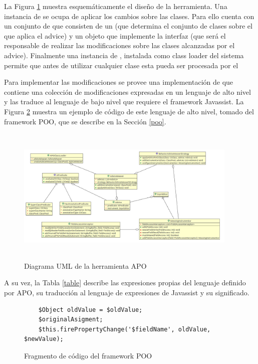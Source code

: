 		La Figura \ref{aopImage} muestra esquemáticamente el diseño de la herramienta.
		Una instancia de  se ocupa de aplicar los cambios sobre las
		clases.
		Para ello cuenta con un conjunto de  que consisten de un
		 (que determina el conjunto de clases sobre el que aplica el
		advice) y un objeto que implemente la interfaz  (que
		será el responsable de realizar las modificaciones sobre
		las clases alcanzadas por el advice).
		Finalmente una instancia de , instalada como class loader
		del sistema permite que antes de utilizar cualquier clase esta pueda ser procesada por el 
		
		Para implementar las modificaciones se provee una implementación de
		 que contiene una colección de modificaciones expresadas en un
		lenguaje de alto nivel y las traduce al lenguaje de bajo nivel que requiere el
		framework Javassist.
		La Figura \ref{pooCode} muestra un ejemplo de código de este lenguaje de alto nivel,
		tomado del framework POO, que se describe en la Sección \ref{poo}.
		
		\begin{figure}[h]
			\centering
			\includegraphics[width=400px, height=250px]{img/aop}
			\caption{Diagrama UML de la herramienta APO}
			\label{aopImage}
		\end{figure}	
		
		
		A su vez, la Tabla \ref{table} describe las expresiones propias del lenguaje
		definido por APO, su traducción al lenguaje de expresiones de
		Javassist y su significado.
		
		\begin{figure}[h]
			\begin{lstlisting}
	$Object oldValue = $oldValue;
	$originalAsigment;
	$this.firePropertyChange('$fieldName', oldValue, $newValue);
			\end{lstlisting}
			\caption{Fragmento de código del framework POO}
			\label{pooCode}
		\end{figure}
		
